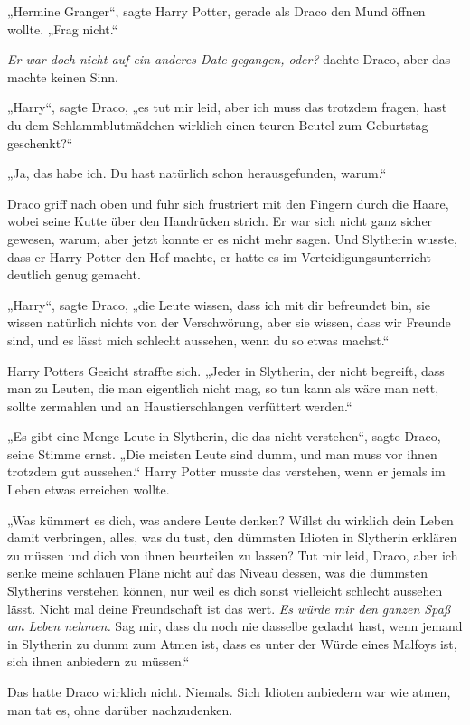 {„Hermine Granger“, sagte Harry Potter, gerade als Draco den Mund öffnen wollte. „Frag nicht.“

\emph{Er war doch nicht auf ein anderes Date gegangen, oder?} dachte Draco, aber das machte keinen Sinn.

„Harry“, sagte Draco, „es tut mir leid, aber ich muss das trotzdem fragen, hast du dem Schlammblutmädchen wirklich einen teuren Beutel zum Geburtstag geschenkt?“

„Ja, das habe ich. Du hast natürlich schon herausgefunden, warum.“

Draco griff nach oben und fuhr sich frustriert mit den Fingern durch die Haare, wobei seine Kutte über den Handrücken strich. Er war sich nicht ganz sicher gewesen, warum, aber jetzt konnte er es nicht mehr sagen. Und Slytherin wusste, dass er Harry Potter den Hof machte, er hatte es im Verteidigungsunterricht deutlich genug gemacht.

„Harry“, sagte Draco, „die Leute wissen, dass ich mit dir befreundet bin, sie wissen natürlich nichts von der Verschwörung, aber sie wissen, dass wir Freunde sind, und es lässt mich schlecht aussehen, wenn du so etwas machst.“

Harry Potters Gesicht straffte sich. „Jeder in Slytherin, der nicht begreift, dass man zu Leuten, die man eigentlich nicht mag, so tun kann als wäre man nett, sollte zermahlen und an Haustierschlangen verfüttert werden.“

„Es gibt eine Menge Leute in Slytherin, die das nicht verstehen“, sagte Draco, seine Stimme ernst. „Die meisten Leute sind dumm, und man muss vor ihnen trotzdem gut aussehen.“ Harry Potter musste das verstehen, wenn er jemals im Leben etwas erreichen wollte.

„Was kümmert es dich, was andere Leute denken? Willst du wirklich dein Leben damit verbringen, alles, was du tust, den dümmsten Idioten in Slytherin erklären zu müssen und dich von ihnen beurteilen zu lassen? Tut mir leid, Draco, aber ich senke meine schlauen Pläne nicht auf das Niveau dessen, was die dümmsten Slytherins verstehen können, nur weil es dich sonst vielleicht schlecht aussehen lässt. Nicht mal deine Freundschaft ist das wert. \emph{Es würde mir den ganzen Spaß am Leben nehmen.} Sag mir, dass du noch nie dasselbe gedacht hast, wenn jemand in Slytherin zu dumm zum Atmen ist, dass es unter der Würde eines Malfoys ist, sich ihnen anbiedern zu müssen.“

Das hatte Draco wirklich nicht. Niemals. Sich Idioten anbiedern war wie atmen, man tat es, ohne darüber nachzudenken.

}
